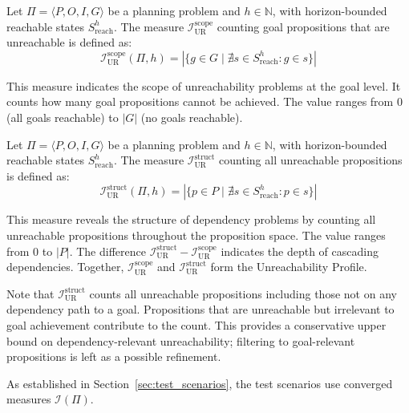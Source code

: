 \begin{defn}
    Let $\Pi = \langle P, O, I, G \rangle$ be a planning problem and $h \in \mathbb{N}$, with horizon-bounded reachable states $S^h_{\text{reach}}$. The measure $\mathcal{I}^{\text{scope}}_{\text{UR}}$ counting goal propositions that are unreachable is defined as:
    \begin{equation*}
        \mathcal{I}^{\text{scope}}_{\text{UR}}(\Pi, h) = |\{g \in G \mid \nexists s \in S^h_{\text{reach}} : g \in s\}|
    \end{equation*}
\end{defn}

This measure indicates the scope of unreachability problems at the goal level. It counts how many goal propositions cannot be achieved. The value ranges from $0$ (all goals reachable) to $|G|$ (no goals reachable).

\begin{defn}
    Let $\Pi = \langle P, O, I, G \rangle$ be a planning problem and $h \in \mathbb{N}$, with horizon-bounded reachable states $S^h_{\text{reach}}$. The measure $\mathcal{I}^{\text{struct}}_{\text{UR}}$ counting all unreachable propositions is defined as:
    \begin{equation*}
        \mathcal{I}^{\text{struct}}_{\text{UR}}(\Pi, h) = |\{p \in P \mid \nexists s \in S^h_{\text{reach}} : p \in s\}|
    \end{equation*}
\end{defn}

This measure reveals the structure of dependency problems by counting all unreachable propositions throughout the proposition space. The value ranges from $0$ to $|P|$. The difference $\mathcal{I}^{\text{struct}}_{\text{UR}} - \mathcal{I}^{\text{scope}}_{\text{UR}}$ indicates the depth of cascading dependencies. Together, $\mathcal{I}^{\text{scope}}_{\text{UR}}$ and $\mathcal{I}^{\text{struct}}_{\text{UR}}$ form the Unreachability Profile.

Note that $\mathcal{I}^{\text{struct}}_{\text{UR}}$ counts all unreachable propositions including those not on any dependency path to a goal. Propositions that are unreachable but irrelevant to goal achievement contribute to the count. This provides a conservative upper bound on dependency-relevant unreachability; filtering to goal-relevant propositions is left as a possible refinement.

As established in Section~\ref{sec:test_scenarios}, the test scenarios use converged measures $\mathcal{I}(\Pi)$.

